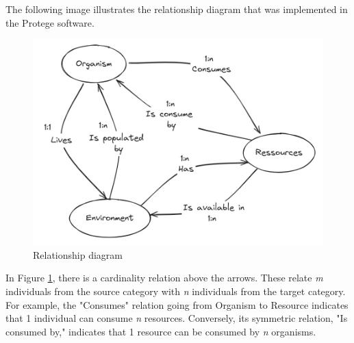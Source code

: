 The following image illustrates the relationship diagram that was implemented in the Protege software.

\begin{figure}[H]
    \centering
    \includegraphics[width=0.7\linewidth]{diagram}
    \caption{Relationship diagram}
    \label{fig:diagram}
\end{figure}

In Figure \ref{fig:diagram}, there is a cardinality relation above the arrows. These relate \textit{m} individuals from the source category with \textit{n} individuals from the target category. For example, the "Consumes" relation going from Organism to Resource indicates that 1 individual can consume \textit{n} resources. Conversely, its symmetric relation, "Is consumed by," indicates that 1 resource can be consumed by \textit{n} organisms.
